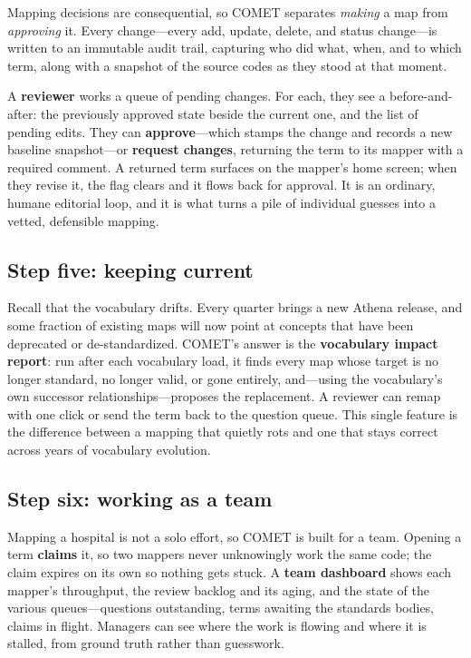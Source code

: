 \documentclass[12pt,openany]{book}
\begin{document}
Mapping decisions are consequential, so COMET separates \emph{making} a map from \emph{approving} it.
Every change---every add, update, delete, and status change---is written to an immutable audit trail,
capturing who did what, when, and to which term, along with a snapshot of the source codes as they
stood at that moment.

A \textbf{reviewer} works a queue of pending changes. For each, they see a before-and-after: the
previously approved state beside the current one, and the list of pending edits. They can
\textbf{approve}---which stamps the change and records a new baseline snapshot---or \textbf{request
changes}, returning the term to its mapper with a required comment. A returned term surfaces on the
mapper's home screen; when they revise it, the flag clears and it flows back for approval. It is an
ordinary, humane editorial loop, and it is what turns a pile of individual guesses into a vetted,
defensible mapping.

\subsection{Step five: keeping current}

Recall that the vocabulary drifts. Every quarter brings a new Athena release, and some fraction of
existing maps will now point at concepts that have been deprecated or de-standardized. COMET's answer
is the \textbf{vocabulary impact report}: run after each vocabulary load, it finds every map whose
target is no longer standard, no longer valid, or gone entirely, and---using the vocabulary's own
successor relationships---proposes the replacement. A reviewer can remap with one click or send the
term back to the question queue. This single feature is the difference between a mapping that quietly
rots and one that stays correct across years of vocabulary evolution.

\subsection{Step six: working as a team}

Mapping a hospital is not a solo effort, so COMET is built for a team. Opening a term \textbf{claims}
it, so two mappers never unknowingly work the same code; the claim expires on its own so nothing gets
stuck. A \textbf{team dashboard} shows each mapper's throughput, the review backlog and its aging, and
the state of the various queues---questions outstanding, terms awaiting the standards bodies, claims in
flight. Managers can see where the work is flowing and where it is stalled, from ground truth rather
than guesswork.
\end{document}
